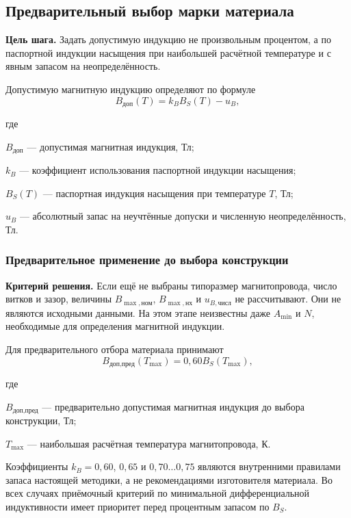 \documentclass[14pt,a4paper]{extarticle}
\newcommand{\criterion}{\par\noindent\textbf{Критерий решения.} }
\newcommand{\stepgoal}[1]{\par\noindent\textbf{Цель шага.} #1\par}
\newenvironment{whereblock}
 {\par\noindent где\par
  \begin{list}{}{\setlength{\leftmargin}{12.5mm}
                  \setlength{\itemindent}{-12.5mm}
                  \setlength{\itemsep}{0pt}
                  \setlength{\parsep}{0pt}
                  \setlength{\topsep}{0pt}}}
 {\end{list}}
\newcommand{\whereitem}[2]{\item[] #1 --- #2}
\begin{document}
\subsection{Предварительный выбор марки материала}
\label{subsec:material-choice}

\stepgoal{Задать допустимую индукцию не произвольным процентом, а по
паспортной индукции насыщения при наибольшей расчётной температуре и с
явным запасом на неопределённость.}

Допустимую магнитную индукцию определяют по формуле
\begin{equation}
 B_{\text{доп}}(T)=k_B B_S(T)-u_B,
 \label{eq:b-allow}
\end{equation}
\begin{whereblock}
\whereitem{$B_{\text{доп}}$}{допустимая магнитная индукция, Тл;}
\whereitem{$k_B$}{коэффициент использования паспортной индукции насыщения;}
\whereitem{$B_S(T)$}{паспортная индукция насыщения при температуре $T$, Тл;}
\whereitem{$u_B$}{абсолютный запас на неучтённые допуски и численную
неопределённость, Тл.}
\end{whereblock}

\subsubsection{Предварительное применение до выбора конструкции}

\criterion Если ещё не выбраны типоразмер магнитопровода, число витков и
зазор, величины $B_{\max,\text{ном}}$, $B_{\max,\text{нх}}$ и
$u_{B,\text{числ}}$ не рассчитывают. Они не являются исходными данными.
На этом этапе неизвестны даже $A_{\min}$ и $N$, необходимые для
определения магнитной индукции.

Для предварительного отбора материала принимают
\begin{equation}
 B_{\text{доп,пред}}(T_{\max})=
 0{,}60 B_S(T_{\max}),
 \label{eq:b-allow-preliminary}
\end{equation}
\begin{whereblock}
\whereitem{$B_{\text{доп,пред}}$}{предварительно допустимая магнитная
индукция до выбора конструкции, Тл;}
\whereitem{$T_{\max}$}{наибольшая расчётная температура
магнитопровода, К.}
\end{whereblock}

Коэффициенты $k_B=0{,}60$, $0{,}65$ и $0{,}70\ldots0{,}75$ являются
внутренними правилами запаса настоящей методики, а не рекомендациями
изготовителя материала. Во всех случаях приёмочный критерий по минимальной
дифференциальной индуктивности имеет приоритет перед процентным запасом по
$B_S$.
\end{document}
